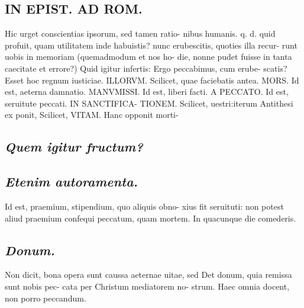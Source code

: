 \documentclass{article}
\begin{document}
\begin{pages}
\section*{IN EPIST. AD ROM.  }
\marginpar{[ p.67 ]}\pstart Hic urget conscientias ipsorum, sed tamen ratio- nibus humanis. q. d. quid profuit, quam utilitatem inde habuistis? nunc erubescitis, quoties illa recur- runt uobis in memoriam (quemadmodum et nos ho- die, nonne pudet fuisse in tanta caecitate et errore?) Quid igitur infertis: Ergo peccabimus, cum erube- scatis? Esset hoc regnum iusticiae. ILLORVM.  Scilicet, quae faciebatis antea. MORS.  Id est, aeterna damnatio. MANVMISSI.  Id est, liberi facti. A PECCATO. Id est, seruitute peccati. IN SANCTIFICA- TIONEM. Scilicet, uestri:iterum Antithesi ex ponit, Scilicet, VITAM. Hanc opponit morti-  \pend
{}
{}
\subsection*{\textit{Quem igitur fructum? }}
{}
\subsection*{\textit{Etenim autoramenta. }}\pstart Id est, praemium, stipendium, quo aliquis obno- xius fit seruituti: non potest aliud praemium confequi peccatum, quam mortem. In quacunque die comederis.   \pend
{}
{}
\subsection*{\textit{Donum. }}\pstart Non dicit, bona opera sunt caussa aeternae uitae, sed Det donum, quia remissa sunt nobis pec- cata per Christum mediatorem no- strum. Haec omnia docent, non porro peccandum.   \pend

\end{pages}
\end{document}
